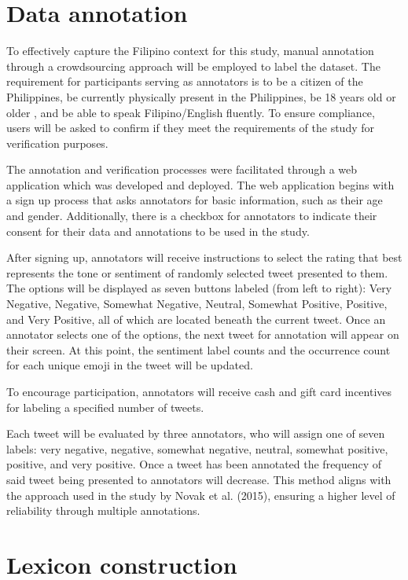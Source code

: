 \section{Data annotation}

To effectively capture the Filipino context for this study, manual annotation through a crowdsourcing approach will be employed to label the dataset. The requirement for participants serving as annotators is to be a citizen of the Philippines, be currently physically present in the Philippines, be 18 years old or older , and be able to speak Filipino/English fluently. To ensure compliance, users will be asked to confirm if they meet the requirements of the study for verification purposes.

The annotation and verification processes were facilitated through a web application which was developed and deployed. The web application begins with a sign up process that asks annotators for basic information, such as their age and gender. Additionally, there is a checkbox for annotators to indicate their consent for their data and annotations to be used in the study. 

After signing up, annotators will receive instructions to select the rating that best represents the tone or sentiment of randomly selected tweet presented to them. The options will be displayed as seven buttons labeled (from left to right): Very Negative, Negative, Somewhat Negative, Neutral, Somewhat Positive, Positive, and Very Positive, all of which are located beneath the current tweet. Once an annotator selects one of the options, the next tweet for annotation will appear on their screen. At this point, the sentiment label counts and the occurrence count for each unique emoji in the tweet will be updated. 

To encourage participation, annotators will receive cash and gift card incentives for labeling a specified number of tweets. 

Each tweet will be evaluated by three annotators, who will assign one of seven labels: very negative, negative, somewhat negative, neutral, somewhat positive, positive, and very positive. Once a tweet has been annotated the frequency of said tweet being presented to annotators will decrease. This method aligns with the approach used in the study by Novak et al. (2015), ensuring a higher level of reliability through multiple annotations.

\section{Lexicon construction}

